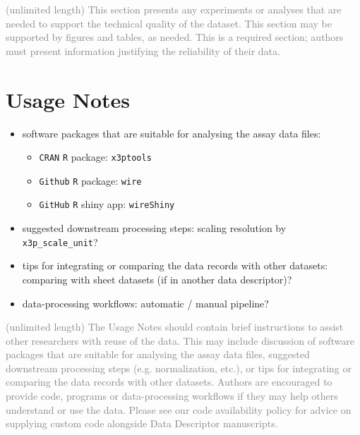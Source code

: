 \documentclass[fleqn,10pt]{wlscirep}
\begin{document}
\textcolor{gray}{(unlimited length) This section presents any experiments or analyses that are needed to support the technical quality of the dataset. This section may be supported by figures and tables, as needed. This is a required section; authors must present information justifying the reliability of their data.}

\section*{Usage Notes}

\begin{itemize}
  \item
  software packages that are suitable for analysing the assay data files:
  \begin{itemize}
    \item
      \texttt{CRAN} \texttt{R} package: \texttt{x3ptools}
      
    \item
      \texttt{Github} \texttt{R} package: \texttt{wire}
    
    \item
      \texttt{GitHub} \texttt{R} shiny app: \texttt{wireShiny}
  \end{itemize}
  
  \item
  suggested downstream processing steps: scaling resolution by \texttt{x3p\_scale\_unit}?
  
  \item
  tips for integrating or comparing the data records with other datasets: comparing with sheet datasets (if in another data descriptor)?
  
  \item
  data-processing workflows: automatic / manual pipeline?
\end{itemize}

\textcolor{gray}{(unlimited length) The Usage Notes should contain brief instructions to assist other researchers with reuse of the data. This may include discussion of software packages that are suitable for analysing the assay data files, suggested downstream processing steps (e.g. normalization, etc.), or tips for integrating or comparing the data records with other datasets. Authors are encouraged to provide code, programs or data-processing workflows if they may help others understand or use the data. Please see our code availability policy for advice on supplying custom code alongside Data Descriptor manuscripts.}
\end{document}
